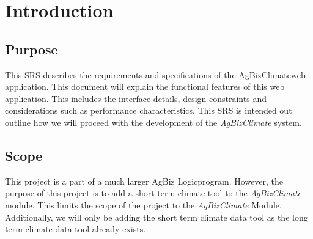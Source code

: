 \documentclass[onecolumn, draftclsnofoot,10pt, compsoc]{article}
\begin{document}
\newpage
{}
\tableofcontents
\listoffigures 
\newpage
\clearpage

\section{Introduction}
		\subsection{Purpose}
		This SRS describes the requirements and specifications of the AgBizClimate\texttrademark web application. This document will explain the functional features of this web application. This includes the interface details, design constraints and considerations such as performance characteristics. This SRS is intended out outline how we will proceed with the development of the \textit{AgBizClimate} system.\\

		\subsection{Scope}
			This project is a part of a much larger AgBiz Logic\texttrademark program. However, the purpose of this project is to add a short term climate tool to the \textit{AgBizClimate} module. This limits the scope of the project to the \textit{AgBizClimate} Module. Additionally, we will only be adding the short term climate data tool as the long term climate data tool already exists.\\
\end{document}
